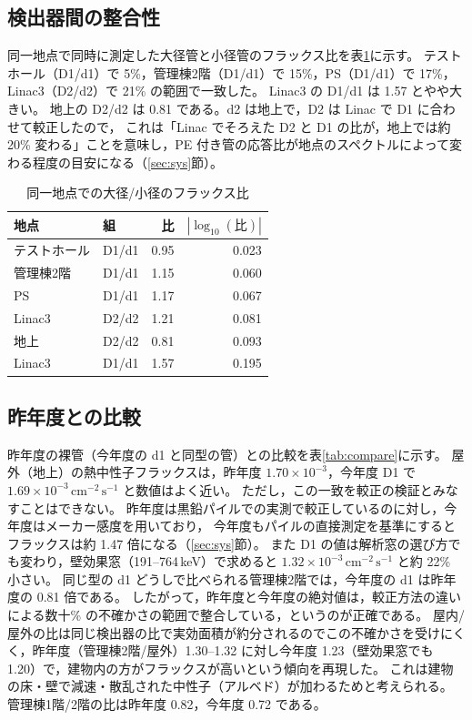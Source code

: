 \documentclass[a4paper,11pt]{ltjsarticle}
\newcommand{\flux}{\mathrm{cm^{-2}\,s^{-1}}}
\begin{document}
\subsection{検出器間の整合性}
\label{sec:det}

同一地点で同時に測定した大径管と小径管のフラックス比を表\ref{tab:detratio}に示す。
テストホール（D1/d1）で 5\%，管理棟2階（D1/d1）で 15\%，PS（D1/d1）で 17\%，Linac3（D2/d2）で 21\% の範囲で一致した。
Linac3 の D1/d1 は 1.57 とやや大きい。
地上の D2/d2 は 0.81 である。d2 は地上で，D2 は Linac で D1 に合わせて較正したので，
これは「Linac でそろえた D2 と D1 の比が，地上では約 20\% 変わる」ことを意味し，PE 付き管の応答比が地点のスペクトルによって変わる程度の目安になる（\ref{sec:sys}節）。

\begin{table}[htbp]
  \centering
  \caption{同一地点での大径/小径のフラックス比}
  \label{tab:detratio}
  \begin{tabular}{llrr}
    \toprule
    地点 & 組 & 比 & $|\log_{10}(\text{比})|$ \\
    \midrule
    テストホール & D1/d1 & 0.95 & 0.023 \\
    管理棟2階 & D1/d1 & 1.15 & 0.060 \\
    PS & D1/d1 & 1.17 & 0.067 \\
    Linac3 & D2/d2 & 1.21 & 0.081 \\
    地上 & D2/d2 & 0.81 & 0.093 \\
    Linac3 & D1/d1 & 1.57 & 0.195 \\
    \bottomrule
  \end{tabular}
\end{table}

\subsection{昨年度との比較}

昨年度の裸管（今年度の d1 と同型の管）との比較を表\ref{tab:compare}に示す。
屋外（地上）の熱中性子フラックスは，昨年度 $1.70\times10^{-3}$，今年度 D1 で $1.69\times10^{-3}\,\flux$ と数値はよく近い。
ただし，この一致を較正の検証とみなすことはできない。
昨年度は黒鉛パイルでの実測で較正しているのに対し，今年度はメーカー感度を用いており，
今年度もパイルの直接測定を基準にするとフラックスは約 1.47 倍になる（\ref{sec:sys}節）。
また D1 の値は解析窓の選び方でも変わり，壁効果窓（191--764\,keV）で求めると $1.32\times10^{-3}\,\flux$ と約 22\% 小さい。
同じ型の d1 どうしで比べられる管理棟2階では，今年度の d1 は昨年度の 0.81 倍である。
したがって，昨年度と今年度の絶対値は，較正方法の違いによる数十\% の不確かさの範囲で整合している，というのが正確である。
屋内/屋外の比は同じ検出器の比で実効面積が約分されるのでこの不確かさを受けにくく，昨年度（管理棟2階/屋外）1.30--1.32 に対し今年度 1.23（壁効果窓でも 1.20）で，建物内の方がフラックスが高いという傾向を再現した。
これは建物の床・壁で減速・散乱された中性子（アルベド）が加わるためと考えられる。
管理棟1階/2階の比は昨年度 0.82，今年度 0.72 である。
\end{document}
